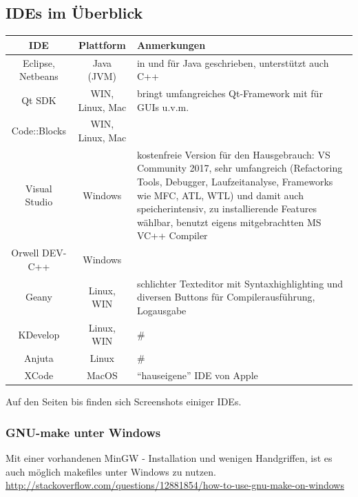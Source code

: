 \documentclass[a4paper]{report}
\begin{document}
\subsection{IDEs im Überblick}
\begin{center}
\begin{tabular}{|c|c|p{10cm}|}
	\hline
	\textbf{IDE} & \textbf{Plattform} & \textbf{Anmerkungen}\\
	\hline
	Eclipse, Netbeans & Java (JVM) & in und für Java geschrieben, unterstützt auch C++ \\
	Qt SDK & WIN, Linux, Mac & bringt umfangreiches Qt-Framework mit für GUIs u.v.m. \\
	Code::Blocks & WIN, Linux, Mac & \\
	\hline
	Visual Studio & Windows & kostenfreie Version für den Hausgebrauch: VS Community 2017, sehr umfangreich (Refactoring Tools, Debugger, Laufzeitanalyse, Frameworks wie MFC, ATL, WTL) und damit auch speicherintensiv, zu installierende Features wählbar, benutzt eigens mitgebrachtten MS VC++ Compiler\\
	Orwell DEV-C++ & Windows &\\
	\hline
	Geany & Linux, WIN & schlichter Texteditor mit Syntaxhighlighting und diversen Buttons für Compilerausführung, Logausgabe\\
	KDevelop & Linux, WIN & \# \\ %
	Anjuta & Linux & \# \\ %
	\hline
	XCode & MacOS & "`hauseigene"' IDE von Apple\\
	\hline
	
\end{tabular}
\vspace{4ex}

Auf den Seiten \pageref{begin:ide:picts} bis \pageref{end:ide:picts} finden sich Screenshots einiger IDEs.

\subsubsection{GNU-make unter Windows}
Mit einer vorhandenen MinGW - Installation und wenigen Handgriffen, ist es auch möglich makefiles unter Windows zu nutzen. \url{http://stackoverflow.com/questions/12881854/how-to-use-gnu-make-on-windows}


\end{center}
\end{document}
